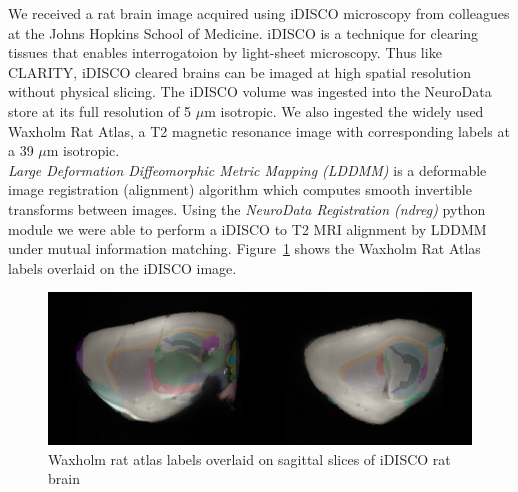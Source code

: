 \documentclass[simplex.tex]{subfiles}
\begin{document}
\clearpage

We received a rat brain image acquired using iDISCO microscopy from colleagues at the Johns Hopkins School of Medicine. 
iDISCO is a technique for clearing tissues that enables interrogatoion by light-sheet microscopy. 
Thus like CLARITY, iDISCO cleared brains can be imaged at high spatial resolution without physical slicing.
The iDISCO volume was ingested into the NeuroData store at its full resolution of 5 $\mu$m isotropic.
We also ingested the widely used Waxholm Rat Atlas, a T2 magnetic resonance image with corresponding labels at a 39 $\mu$m isotropic.\\

\textit{Large Deformation Diffeomorphic Metric Mapping (LDDMM)} is a deformable image registration (alignment) algorithm which computes smooth invertible transforms between images.
Using the \textit{NeuroData Registration (ndreg)} python module we were able to perform a iDISCO to T2 MRI alignment by LDDMM under mutual information matching.
Figure~\ref{fig:idisco} shows the Waxholm Rat Atlas labels overlaid on the iDISCO image.

\begin{figure}[!h]
 \begin{cframed}
  \centering
   \includegraphics[width=\textwidth]{../../figs/iDISCO.png}  
   \caption{Waxholm rat atlas labels overlaid on sagittal slices of iDISCO rat brain}
  \label{fig:idisco}
 \end{cframed}
\end{figure}

\clearpage
\end{document}
